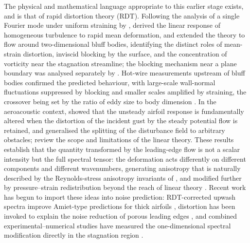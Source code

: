 \documentclass[lineno]{JFM-FLM_Au}
\begin{document}
The physical and mathematical language appropriate to this earlier stage
exists, and is that of rapid distortion theory (RDT). Following the analysis
of a single Fourier mode under uniform straining by \citet{Taylor1935},
\citet{BatchelorProudman1954} derived the linear response of homogeneous
turbulence to rapid mean deformation, and \citet{Hunt1973} extended the
theory to flow around two-dimensional bluff bodies, identifying the distinct
roles of mean-strain distortion, inviscid blocking by the surface, and the
concentration of vorticity near the stagnation streamline; the blocking
mechanism near a plane boundary was analysed separately by
\citet{HuntGraham1978}. Hot-wire measurements upstream of bluff bodies
confirmed the predicted behaviour, with large-scale wall-normal fluctuations
suppressed by blocking and smaller scales amplified by straining, the
crossover being set by the ratio of eddy size to body dimension
\citep{Bearman1972,BritterHuntMumford1979}. In the aeroacoustic context,
\citet{GoldsteinAtassi1976} showed that the unsteady airfoil response is
fundamentally altered when the distortion of the incident gust by the steady
potential flow is retained, and \citet{Goldstein1978} generalised the
splitting of the disturbance field to arbitrary obstacles;
\citet{HuntCarruthers1990} review the scope and limitations of the linear
theory. These results establish that the quantity transformed by the
leading-edge flow is not a scalar intensity but the full spectral tensor:
the deformation acts differently on different components and different
wavenumbers, generating anisotropy that is naturally described by the
Reynolds-stress anisotropy invariants of \citet{LumleyNewman1977}, and
modified further by pressure--strain redistribution beyond the reach of
linear theory \citep{SpezialeSarkarGatski1991,Pope2000}. Recent work has
begun to import these ideas into noise prediction: RDT-corrected upwash
spectra improve Amiet-type predictions for thick airfoils
\citep{deSantana2016,dosSantos2023}, distortion has been invoked to explain
the noise reduction of porous leading edges \citep{Zamponi2020}, and
combined experimental--numerical studies have measured the one-dimensional
spectral modification directly in the stagnation region \citep{Piccolo2024}.
\end{document}
